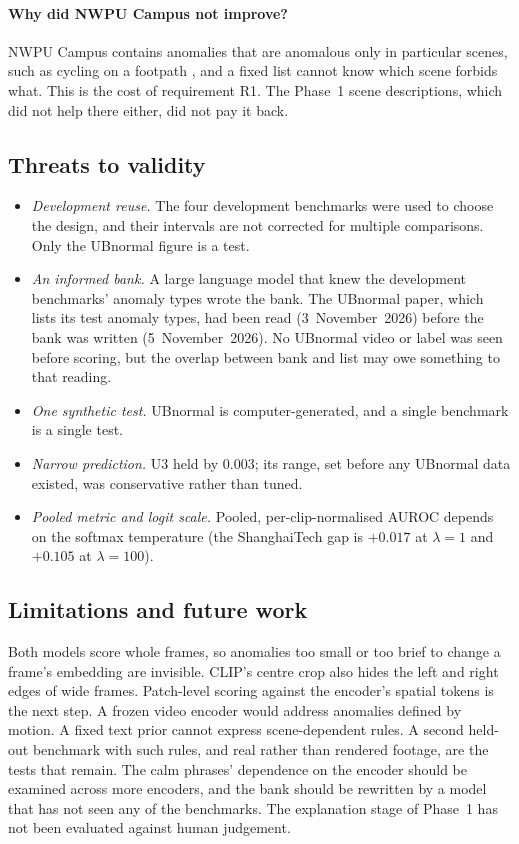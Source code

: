 \documentclass[conference,a4paper]{IEEEtran}
\begin{document}
\paragraph*{Why did NWPU Campus not improve?}
NWPU Campus contains anomalies that are anomalous only in particular scenes,
such as cycling on a footpath \cite{cao2023nwpu}, and a fixed list cannot know
which scene forbids what. This is the cost of requirement R1. The Phase~1
scene descriptions, which did not help there either, did not pay it back.

\subsection{Threats to validity}
\begin{itemize}
  \item \emph{Development reuse.} The four development benchmarks were used to
        choose the design, and their intervals are not corrected for multiple
        comparisons. Only the UBnormal figure is a test.
  \item \emph{An informed bank.} A large language model that knew the
        development benchmarks' anomaly types wrote the bank. The UBnormal paper,
        which lists its test anomaly types, had been read (3~November~2026)
        before the bank was written (5~November~2026). No UBnormal video or label
        was seen before scoring, but the overlap between bank and list may owe
        something to that reading.
  \item \emph{One synthetic test.} UBnormal is computer-generated, and a single
        benchmark is a single test.
  \item \emph{Narrow prediction.} U3 held by $0.003$; its range, set before any
        UBnormal data existed, was conservative rather than tuned.
  \item \emph{Pooled metric and logit scale.} Pooled, per-clip-normalised AUROC
        depends on the softmax temperature (the ShanghaiTech gap is $+0.017$ at
        $\lambda=1$ and $+0.105$ at $\lambda=100$).
\end{itemize}

\subsection{Limitations and future work}
Both models score whole frames, so anomalies too small or too brief to change a
frame's embedding are invisible. CLIP's centre crop also hides the left and right
edges of wide frames. Patch-level scoring against the encoder's spatial tokens
\cite{jeong2023winclip, zhou2024anomalyclip} is the next step. A frozen video
encoder would address anomalies defined by motion. A fixed text prior cannot
express scene-dependent rules. A second held-out benchmark with such rules, and
real rather than rendered footage, are the tests that remain. The calm phrases'
dependence on the encoder should be examined across more encoders, and the bank
should be rewritten by a model that has not seen any of the benchmarks. The
explanation stage of Phase~1 has not been evaluated against human judgement.
\end{document}

